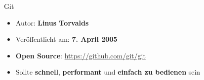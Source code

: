 \begin{frame}{Git}
  \begin{itemize}
    \item Autor: \textbf{Linus Torvalds}
    \pause
    \item Veröffentlicht am: \textbf{7. April 2005}
    \pause
    \item \textbf{Open Source}: \url{https://github.com/git/git}
    \pause
    \item Sollte \textbf{schnell}, \textbf{performant} und \textbf{einfach zu bedienen} sein
  \end{itemize}

\end{frame}
